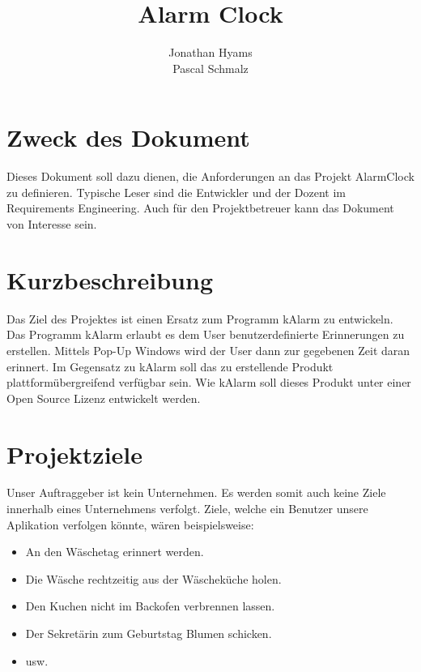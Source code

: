 \documentclass[11pt,titelpage]{scrartcl}
\title{Alarm Clock }
\author{Jonathan Hyams \\Pascal Schmalz}
\begin{document}
\thispagestyle{empty}
\maketitle
\tableofcontents

\pagestyle{fancy}


\begin{abstract}
\end{abstract}
\pagebreak

\section{Zweck des Dokument}
Dieses Dokument soll dazu dienen, die Anforderungen an das Projekt AlarmClock zu definieren. Typische Leser sind die
Entwickler und der Dozent im Requirements Engineering. Auch für den Projektbetreuer kann das Dokument von Interesse sein.

\section{Kurzbeschreibung}
Das Ziel des Projektes ist einen Ersatz zum Programm kAlarm zu entwickeln.
Das Programm kAlarm erlaubt es dem User benutzerdefinierte Erinnerungen zu erstellen. Mittels Pop-Up Windows wird der
User dann zur gegebenen Zeit daran erinnert. Im Gegensatz zu kAlarm soll das zu erstellende Produkt
plattformübergreifend verfügbar sein. Wie kAlarm soll dieses Produkt unter einer Open Source Lizenz entwickelt werden.

\section{Projektziele}
Unser Auftraggeber ist kein Unternehmen. Es werden somit auch keine Ziele innerhalb eines Unternehmens verfolgt.
Ziele, welche ein Benutzer unsere Aplikation verfolgen könnte, wären beispielsweise:
\begin{itemize}
 \item An den Wäschetag erinnert werden.
 \item Die Wäsche rechtzeitig aus der Wäscheküche holen.
 \item Den Kuchen nicht im Backofen verbrennen lassen.
 \item Der Sekretärin zum Geburtstag Blumen schicken.
 \item usw.

\end{itemize}
\end{document}
